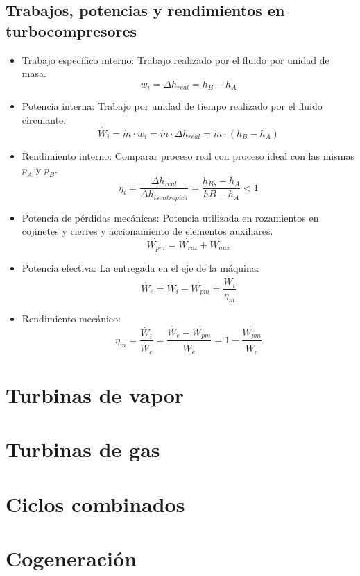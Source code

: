 \subsection{Trabajos, potencias y rendimientos en turbocompresores}
\begin{itemize}
    \item Trabajo específico interno: Trabajo realizado por el fluido por unidad de masa.
    \begin{equation}
        w_i = \Delta h_{real} = h_B - h_A
    \end{equation}
    \item Potencia interna: Trabajo por unidad de tiempo realizado por el fluido circulante.
    \begin{equation}
        \dot{W_i} = \dot{m} \cdot w_i = \dot{m} \cdot \Delta h_{real} = \dot{m} \cdot (h_B - h_A)
    \end{equation}
    \item Rendimiento interno: Comparar proceso real con proceso ideal con las mismas $p_A$ y $p_B$.
    \begin{equation}
        \eta_i = \frac{\Delta h_{real}}{\Delta h_{isentropica}} = \frac{h_{Bs} - h_A}{hB - h_A} < 1
    \end{equation}
    \item Potencia de pérdidas mecánicas: Potencia utilizada en rozamientos en cojinetes y cierres y accionamiento de elementos auxiliares.
    \begin{equation}
        \dot{W_{pm}} = \dot{W_{roz}} + \dot{W_{aux}}
    \end{equation}
    \item Potencia efectiva: La entregada en el eje de la máquina:
    \begin{equation}
        \dot{W_e} = \dot{W_i} - \dot{W_{pm}} = \frac{\dot{W_i}}{\eta_m} 
    \end{equation}
    \item Rendimiento mecánico:
    \begin{equation}
        \eta_m = \frac{\dot{W_i}}{\dot{W_e}} = \frac{\dot{W_e} -  \dot{W_{pm}}}{\dot{W_e}} = 1 - \frac{\dot{W_{pm}}}{\dot{W_e}}
    \end{equation}
\end{itemize}

\section{Turbinas de vapor}

\section{Turbinas de gas}

\section{Ciclos combinados}

\section{Cogeneración}
